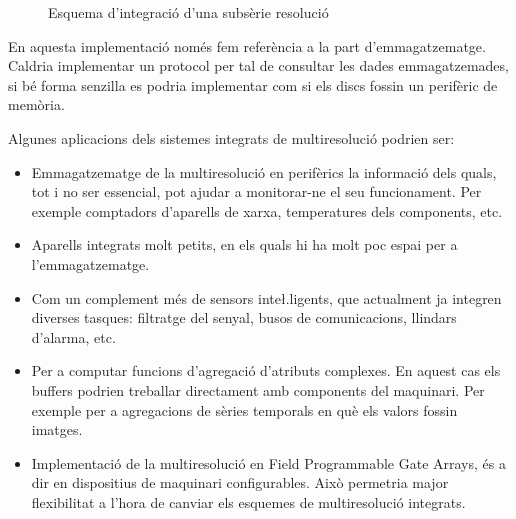 \begin{figure}[htp]
\centering

\caption{Esquema d'integració d'una subsèrie resolució}
\label{fig:vhdl:resolucio}
\end{figure}

En aquesta implementació només fem referència a la part
d'emmagatzematge.  Caldria implementar un protocol per tal de
consultar les dades emmagatzemades, si bé forma senzilla es podria
implementar com si els discs fossin un perifèric de memòria.  




Algunes aplicacions dels sistemes integrats de multiresolució podrien ser:

\begin{itemize}
\item Emmagatzematge de la multiresolució en perifèrics la informació
  dels quals, tot i no ser essencial,  pot ajudar a monitorar-ne el seu
  funcionament. Per exemple comptadors d'aparells de xarxa,
  temperatures dels components, etc.

\item Aparells integrats molt petits, en els quals hi ha molt poc
  espai per a l'emmagatzematge. %

\item Com un complement més de sensors inte\l.ligents, que actualment
  ja integren diverses tasques: filtratge del senyal, busos de
  comunicacions, llindars d'alarma, etc.


\item Per a computar funcions d'agregació d'atributs complexes. En
  aquest cas els buffers podrien treballar directament amb components
  del maquinari. Per exemple per a agregacions de sèries temporals en
  què els valors fossin imatges.

\item Implementació de la multiresolució en Field Programmable Gate
  Arrays, és a dir en dispositius de maquinari configurables. Això
  permetria major flexibilitat a l'hora de canviar els esquemes de
  multiresolució integrats.



\end{itemize}






